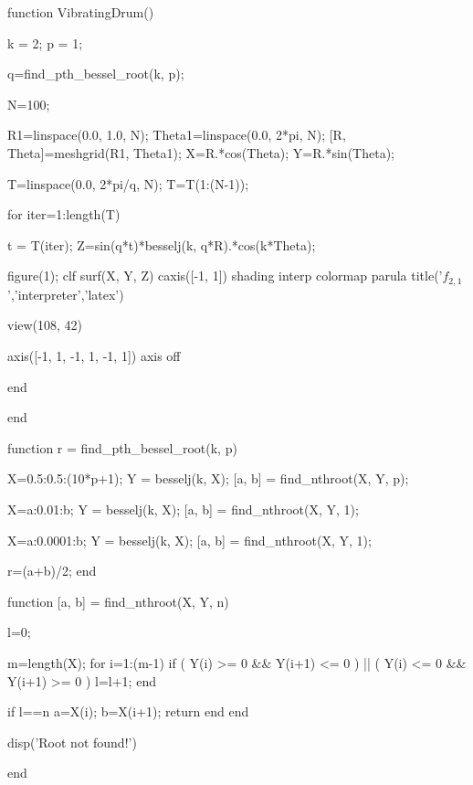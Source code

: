 \begin{codematlab}
function VibratingDrum()

k = 2; %
p = 1; %

q=find_pth_bessel_root(k, p); 

N=100; %

R1=linspace(0.0, 1.0, N); 
Theta1=linspace(0.0, 2*pi, N);
[R, Theta]=meshgrid(R1, Theta1);
X=R.*cos(Theta);
Y=R.*sin(Theta);

T=linspace(0.0, 2*pi/q, N); 
T=T(1:(N-1));

for iter=1:length(T)

t = T(iter);
Z=sin(q*t)*besselj(k, q*R).*cos(k*Theta);

figure(1); clf
surf(X, Y, Z)
caxis([-1, 1])
shading interp
colormap parula
title('$f_{2,1}$','interpreter','latex')

view(108, 42)

axis([-1, 1, -1, 1, -1, 1])
axis off


end

end


function r = find_pth_bessel_root(k, p)

X=0.5:0.5:(10*p+1); Y = besselj(k, X);
[a, b] = find_nthroot(X, Y, p);

X=a:0.01:b; Y = besselj(k, X);
[a, b] = find_nthroot(X, Y, 1);

X=a:0.0001:b; Y = besselj(k, X);
[a, b] = find_nthroot(X, Y, 1);

r=(a+b)/2;
end

function [a, b] = find_nthroot(X, Y, n)

l=0;

m=length(X);
for i=1:(m-1)
if ( Y(i) >= 0  && Y(i+1) <= 0 ) || ( Y(i) <= 0  && Y(i+1) >= 0 )
l=l+1;
end

if l==n
a=X(i); b=X(i+1);
return
end
end

disp('Root not found!')

end
\end{codematlab}

